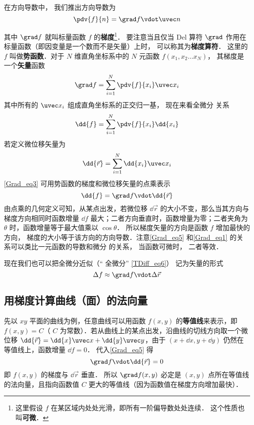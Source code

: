 

在方向导数中， 我们推出方向导数为
\begin{equation}\label{Grad_eq1}
\pdv{f}{n} = \grad f \vdot \uvec n
\end{equation}
 
其中 $\grad f$ 就叫标量函数 $f$ 的\textbf{梯度}\footnote{这里假设 $f$ 在某区域内处处光滑，即所有一阶偏导数处处连续． 这个性质也叫\textbf{可微}．}． 要注意当且仅当 Del 算符 $\grad$ 作用在标量函数（即因变量是一个数而不是矢量）上时， 可以称其为\textbf{梯度算符}． 这里的 $f$ 叫做\textbf{势函数}．对于 $N$ 维直角坐标系中的 $N$ 元函数 $f(x_1,x_2\dots x_N)$， 其梯度是一个\textbf{矢量}函数
\begin{equation}
\grad f = \sum_{i=1}^{N}\pdv{f}{x_i}\uvec x_i
\end{equation}
其中所有的 $\uvec x_i$ 组成直角坐标系的正交归一基， 现在来看全微分 关系
\begin{equation}\label{Grad_eq3}
\dd{f} = \sum_{i = 1}^N \pdv{f}{x_i} \dd{x_i}
\end{equation}
若定义微位移矢量为
\begin{equation}
\dd{\vec r} = \sum_{i=1}^{N} \dd{x_i} \uvec x_i
\end{equation}
\autoref{Grad_eq3} 可用势函数的梯度和微位移矢量的点乘表示
\begin{equation}\label{Grad_eq5}
\dd{f} = \grad f \vdot \dd{\vec r}
\end{equation}
由点乘的几何定义可知，从某点出发，若微位移 $\dd{\vec r}$ 的大小不变，那么当其方向与梯度方向相同时函数增量 $\dd{f}$ 最大；二者方向垂直时，函数增量为零；二者夹角为 $\theta$ 时，函数增量等于最大值乘以 $\cos \theta$． 所以梯度矢量的方向是函数 $f$ 增加最快的方向， 梯度的大小等于该方向的方向导数．注意\autoref{Grad_eq5} 和\autoref{Grad_eq1} 的关系可以类比一元函数的导数和微分 的关系， 当函数可微时， 二者等效．

现在我们也可以把全微分近似（“ 全微分” \autoref{TDiff_eq6}） 记为矢量的形式
\begin{equation}\label{Grad_eq6}
\Delta f \approx \grad f \vdot \Delta \vec r
\end{equation}

\subsection{用梯度计算曲线（面）的法向量}
先以 $xy$ 平面的曲线为例，任意曲线可以用函数 $f(x,y)$ 的\textbf{等值线}来表示，即 $f(x,y) = C$（ $C$ 为常数）．若从曲线上的某点出发，沿曲线的切线方向取一个微位移 $\dd{\vec r} = \dd{x}\uvec x + \dd{y} \uvec y$，由于 $(x+\dd{x}, y+\dd{y})$ 仍然在等值线上，函数增量 $\dd{f} = 0$． 代入\autoref{Grad_eq5} 得
\begin{equation}
\grad f \vdot \dd{\vec r} = 0
\end{equation}
即 $f(x,y)$ 的梯度与 $\dd{\vec r}$ 垂直． 所以 $\grad f(x,y)$ 必定是 $(x,y)$ 点所在等值线的法向量，且指向函数值 $C$ 更大的等值线（因为函数值在梯度方向增加最快）．


